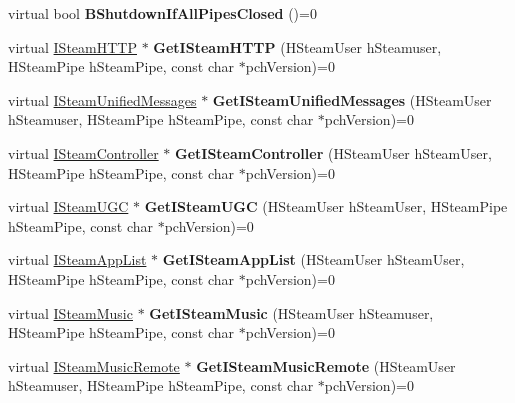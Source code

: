 \begin{DoxyCompactItemize}
virtual bool {\bfseries B\+Shutdown\+If\+All\+Pipes\+Closed} ()=0
\item 
\mbox{\label{class_i_steam_client_ab2d3f0ac0c549a30446281b1540373e6}} 
virtual \hyperlink{class_i_steam_h_t_t_p}{I\+Steam\+H\+T\+TP} $\ast$ {\bfseries Get\+I\+Steam\+H\+T\+TP} (H\+Steam\+User h\+Steamuser, H\+Steam\+Pipe h\+Steam\+Pipe, const char $\ast$pch\+Version)=0
\item 
\mbox{\label{class_i_steam_client_a0bab727a7193d47e93c2927405ccbd06}} 
virtual \hyperlink{class_i_steam_unified_messages}{I\+Steam\+Unified\+Messages} $\ast$ {\bfseries Get\+I\+Steam\+Unified\+Messages} (H\+Steam\+User h\+Steamuser, H\+Steam\+Pipe h\+Steam\+Pipe, const char $\ast$pch\+Version)=0
\item 
\mbox{\label{class_i_steam_client_a0531bd3d6001a10c041d15accaf17f5b}} 
virtual \hyperlink{class_i_steam_controller}{I\+Steam\+Controller} $\ast$ {\bfseries Get\+I\+Steam\+Controller} (H\+Steam\+User h\+Steam\+User, H\+Steam\+Pipe h\+Steam\+Pipe, const char $\ast$pch\+Version)=0
\item 
\mbox{\label{class_i_steam_client_a8c10ba747f7bd892506f8c1bf198552c}} 
virtual \hyperlink{class_i_steam_u_g_c}{I\+Steam\+U\+GC} $\ast$ {\bfseries Get\+I\+Steam\+U\+GC} (H\+Steam\+User h\+Steam\+User, H\+Steam\+Pipe h\+Steam\+Pipe, const char $\ast$pch\+Version)=0
\item 
\mbox{\label{class_i_steam_client_a2de12d3b253767a74b0112b542c7e7b1}} 
virtual \hyperlink{class_i_steam_app_list}{I\+Steam\+App\+List} $\ast$ {\bfseries Get\+I\+Steam\+App\+List} (H\+Steam\+User h\+Steam\+User, H\+Steam\+Pipe h\+Steam\+Pipe, const char $\ast$pch\+Version)=0
\item 
\mbox{\label{class_i_steam_client_ab5580f6c84a63c879ca5685180775632}} 
virtual \hyperlink{class_i_steam_music}{I\+Steam\+Music} $\ast$ {\bfseries Get\+I\+Steam\+Music} (H\+Steam\+User h\+Steamuser, H\+Steam\+Pipe h\+Steam\+Pipe, const char $\ast$pch\+Version)=0
\item 
\mbox{\label{class_i_steam_client_aff68d261527fd710c0787736f1e5e75b}} 
virtual \hyperlink{class_i_steam_music_remote}{I\+Steam\+Music\+Remote} $\ast$ {\bfseries Get\+I\+Steam\+Music\+Remote} (H\+Steam\+User h\+Steamuser, H\+Steam\+Pipe h\+Steam\+Pipe, const char $\ast$pch\+Version)=0

\end{DoxyCompactItemize}
